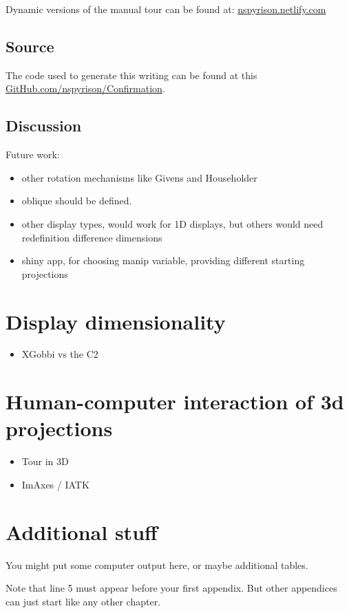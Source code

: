 \documentclass{monashthesis}
\begin{document}
Dynamic versions of the manual tour can be found at:
\href{https://nspyrison.netlify.com/else/pdfsense_manualtours/}{nspyrison.netlify.com}

\hypertarget{source}{%
\section{Source}\label{source}}

The code used to generate this writing can be found at this \href{https://github.com/nspyrison/Confirmation/}{GitHub.com/nspyrison/Confirmation}.

\hypertarget{discussion}{%
\section{Discussion}\label{discussion}}

Future work:

\begin{itemize}
\tightlist
\item
  other rotation mechanisms like Givens and Householder
\item
  oblique should be defined.
\item
  other display types, would work for 1D displays, but others would need redefinition difference dimensions
\item
  shiny app, for choosing manip variable, providing different starting projections
\end{itemize}

\hypertarget{ch:disp_dim}{%
\chapter{Display dimensionality}\label{ch:disp_dim}}

\begin{itemize}
\tightlist
\item
  XGobbi vs the C2
\end{itemize}

\hypertarget{ch:hci_3dproj}{%
\chapter{Human-computer interaction of 3d projections}\label{ch:hci_3dproj}}

\begin{itemize}
\tightlist
\item
  Tour in 3D
\item
  ImAxes / IATK
\end{itemize}

\appendix

\hypertarget{additional-stuff}{%
\chapter{Additional stuff}\label{additional-stuff}}

You might put some computer output here, or maybe additional tables.

Note that line 5 must appear before your first appendix. But other appendices can just start like any other chapter.

\printbibliography[heading=bibintoc]
\end{document}
